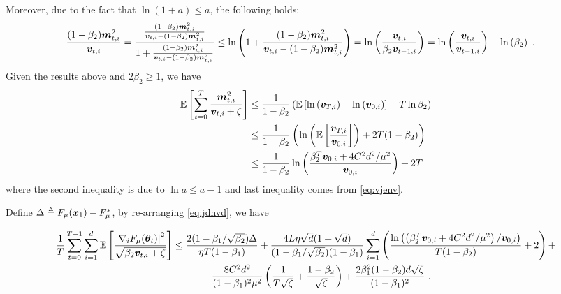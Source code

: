 \begin{appendices}
Moreover, due to the fact that $\ln(1+a) \leq a$,  the following holds:
\begin{equation}
\begin{aligned}
\frac{(1-\beta_2){\bm{m}}_{t,i}^2}{{\bm{v}}_{t,i}} &= \frac{\frac{(1-\beta_2){\bm{m}}_{t,i}^2}{{\bm{v}}_{t,i} - (1-\beta_2){\bm{m}}_{t,i}^2}}{1 + \frac{(1-\beta_2){\bm{m}}_{t,i}^2}{{\bm{v}}_{t,i} - (1-\beta_2){\bm{m}}_{t,i}^2}} \leq \ln\left(1 + \frac{(1-\beta_2){\bm{m}}_{t,i}^2}{{\bm{v}}_{t,i} - (1-\beta_2){\bm{m}}_{t,i}^2}\right) = \ln\left(\frac{{\bm{v}}_{t,i}}{\beta_2 {\bm{v}}_{t-1,i}}\right) = \ln\left(\frac{{\bm{v}}_{t,i}}{{\bm{v}}_{t-1,i}}\right) - \ln\left(\beta_2\right) \ .
\end{aligned}
\end{equation}
Given the results above and $2\beta_2 \geq 1$, we have
\begin{equation}
\begin{aligned}
\mathbb{E}\left[\sum_{t=0}^{T} \frac{{\bm{m}}_{t,i}^2}{{\bm{v}}_{t,i}+\zeta}\right] &\leq \frac{1}{1-\beta_2} \left(\mathbb{E}\left[\ln\left({\bm{v}}_{T,i}\right) - \ln\left({\bm{v}}_{0,i}\right)\right] - T\ln{\beta_2}\right) \\
&\leq \frac{1}{1-\beta_2}\left(\ln\left(\mathbb{E}\left[\frac{{\bm{v}}_{T,i}}{{\bm{v}}_{0,i}}\right]\right) + 2T(1-\beta_2)\right) \\
&\leq \frac{1}{1-\beta_2}\ln\left(\frac{\beta_2^{T}{\bm{v}}_{0,i} + 4C^2d^2/\mu^2}{{\bm{v}}_{0,i}}\right) + 2T \label{eq:vmele}
\end{aligned}
\end{equation}
where the second inequality is due to $\ln a \leq a - 1$ and  last inequality comes from \eqref{eq:vjenv}.

Define $\Delta \triangleq F_{\mu}({\bm{x}}_1) - F^*_{\mu}$, by re-arranging \eqref{eq:jdnvd}, we have

\begin{equation}
\begin{aligned}
\frac{1}{T}\sum_{t=0}^{T-1} \sum_{i=1}^d \mathbb{E}\left[\frac{\left|\nabla_i F_{\mu}({\bm{\theta}}_t)\right|^2}{\sqrt{\beta_2{\bm{v}}_{t,i} + \zeta}}\right] &\leq \frac{2(1-\beta_1/\sqrt{\beta_2})\Delta}{\eta T(1-\beta_1)} + \frac{4L\eta\sqrt{d}(1 + \sqrt{d})}{(1-\beta_1/\sqrt{\beta_2})(1-\beta_1)}\sum_{i=1}^d\left(\frac{\ln\left(\left(\beta_2^{T}{\bm{v}}_{0,i} + 4C^2d^2/\mu^2\right)/{\bm{v}}_{0,i}\right)}{T(1-\beta_2)} + 2\right) + \\
&\qquad \qquad  \frac{8C^2 d^2}{(1-\beta_1)^2\mu^2}\left(\frac{1}{T\sqrt{\zeta}} + \frac{1-\beta_2}{\sqrt{\zeta}}\right) + \frac{2\beta_1^2(1-\beta_2)d\sqrt{\zeta}}{(1-\beta_1)^2} \ .
\end{aligned}
\end{equation}


\end{appendices}
